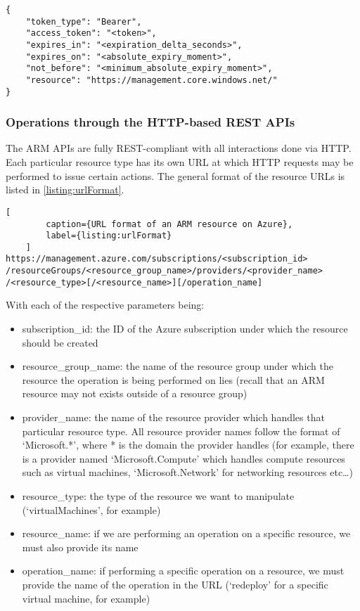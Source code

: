 \documentclass[11pt]{report}
\begin{document}
\begin{listing}[H]
\caption{Structure of token response.}
\label{listing:tokenResponse}
\begin{verbatim}
{
    "token_type": "Bearer",
    "access_token": "<token>",
    "expires_in": "<expiration_delta_seconds>",
    "expires_on": "<absolute_expiry_moment>",
    "not_before": "<minimum_absolute_expiry_moment>",
    "resource": "https://management.core.windows.net/"
}
\end{verbatim}
\end{listing}

\subsubsection{Operations through the HTTP-based REST APIs}

The ARM APIs are fully REST-compliant with all interactions done via HTTP\@. Each
particular resource type has its own URL at which HTTP requests may be
performed to issue certain actions. The general format of the resource URLs is
listed in \ref{listing:urlFormat}.

\begin{lstlisting}[
        caption={URL format of an ARM resource on Azure},
        label={listing:urlFormat}
    ]
https://management.azure.com/subscriptions/<subscription_id>
/resourceGroups/<resource_group_name>/providers/<provider_name>
/<resource_type>[/<resource_name>][/operation_name]
\end{lstlisting}

With each of the respective parameters being:

\begin{itemize}
    \item{subscription\_id}: the ID of the Azure subscription under which the
        resource should be created
    \item{resource\_group\_name}: the name of the resource group under which
        the resource the operation is being performed on lies (recall that an
        ARM resource may not exists outside of a resource group)
    \item{provider\_name}: the name of the resource provider which handles that
        particular resource type. All resource provider names follow the format
        of `Microsoft.*', where * is the domain the provider handles (for
        example, there is a provider named `Microsoft.Compute' which handles
        compute resources such as virtual machines, `Microsoft.Network' for
        networking resources etc\ldots)
    \item{resource\_type}: the type of the resource we want to manipulate
        (`virtualMachines', for example)
    \item{resource\_name}: if we are performing an operation on a specific
        resource, we must also provide its name
    \item{operation\_name}: if performing a specific operation on a resource,
        we must provide the name of the operation in the URL (`redeploy' for
        a specific virtual machine, for example)
\end{itemize}
\end{document}
